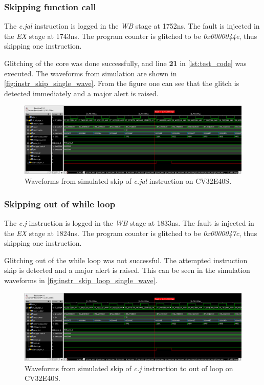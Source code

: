 \subsubsection{Skipping function call}
\label{subsubsec:func_call}

The \textit{c.jal} instruction is logged in the \textit{WB} stage at 1752ns. The fault is injected in the \textit{EX} stage at 1743ns. The program counter is glitched to be \textit{0x0000044e}, thus skipping one instruction. 

Glitching of the core was done successfully, and line \textbf{21} in \autoref{lst:test_code} was executed. The waveforms from simulation are shown in \autoref{fig:instr_skip_single_wave}. From the figure one can see that the glitch is detected immediately and a major alert is raised. 

\begin{figure}[h!]
    \centering
    \includegraphics[width=\textwidth]{docs/images/instr_skip_glitch_injection_single_core.png}
    \caption{Waveforms from simulated skip of \textit{c.jal} instruction on CV32E40S.}
    \label{fig:instr_skip_single_wave}
\end{figure}

\subsubsection{Skipping out of while loop}

The \textit{c.j} instruction is logged in the \textit{WB} stage at 1833ns. The fault is injected in the \textit{EX} stage at 1824ns. The program counter is glitched to be \textit{0x0000047c}, thus skipping one instruction.

Glitching out of the while loop was not successful. The attempted instruction skip is detected and a major alert is raised. This can be seen in the simulation waveforms in \autoref{fig:instr_skip_loop_single_wave}. 

\begin{figure}[h!]
    \centering
    \includegraphics[width=\textwidth]{docs/images/instr_skip_glitch_injection_single_core.png}
    \caption{Waveforms from simulated skip of \textit{c.j} instruction to out of loop on CV32E40S.}
    \label{fig:instr_skip_loop_single_wave}
\end{figure}

